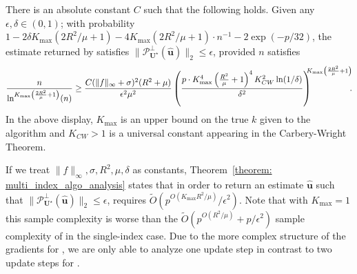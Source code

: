 \documentclass[final,12pt]{colt2018} %
\renewcommand\v[1]{{\ensuremath{\boldsymbol{#1}}}}
\begin{document}
\begin{theorem}
\label{theorem: multi_index_algo_analysis}
There is an absolute constant $C$ such that the following holds.
Given any $\epsilon,\delta \in (0,1)$; with probability $1-2\delta K_\text{max} (2R^2/\mu + 1)-4K_\text{max} \left(2R^2/\mu + 1\right)\cdot n^{-1}-2\exp(-p/32)$, the estimate returned by  satisfies %
$\| \mathcal{P}^\perp_{\mathcal{\v U}^\star} (\hat{\v u}) \|_2 \leq \epsilon$,
provided $n$ satisfies 
\begin{align*}
    \frac{n}{ \ln^{K_\text{max}\left(\frac{2R^2}{\mu}+1\right)}(n)}\geq\frac{C (\|f\|_\infty + \sigma)^2 (R^2 + \mu)}{\epsilon^2 \mu^2} \left( \frac{p\cdot K_\text{max}^4\left( \frac{R^2}{\mu} + 1\right)^4K_{CW}^2 \ln(1/\delta)}{\delta^2} \right)^{\kern-5pt K_\text{max}\left(\frac{2R^2}{\mu}+1\right)} \kern-5pt .
\end{align*}
In the above display, $K_\text{max}$ is an upper bound on the true $k$ given to the algorithm and $K_{CW}>1$ is a universal constant appearing in the Carbery-Wright Theorem. 
\end{theorem}
\begin{remark}
If we treat $\|f\|_\infty, \sigma, R^2,\mu,\delta$ as constants, Theorem~\ref{theorem: multi_index_algo_analysis} states that in order to return an estimate $\hat{\v u}$ such that $\| \mathcal{P}^\perp_{\mathcal{\v U}^\star} (\hat{\v u}) \|_2 \leq \epsilon$,  requires $\tilde{O}(p^{O(K_\text{max}R^2/\mu)}/\epsilon^2)$. Note that with $K_\text{max} = 1$ this sample complexity is worse than the $\tilde{O}(p^{O(R^2/\mu)} + p/\epsilon^2)$ sample complexity of  in the single-index case. Due to the more complex structure of the gradients for , we are only able to analyze one update step in contrast to two update steps for . 
\end{remark}
\end{document}
